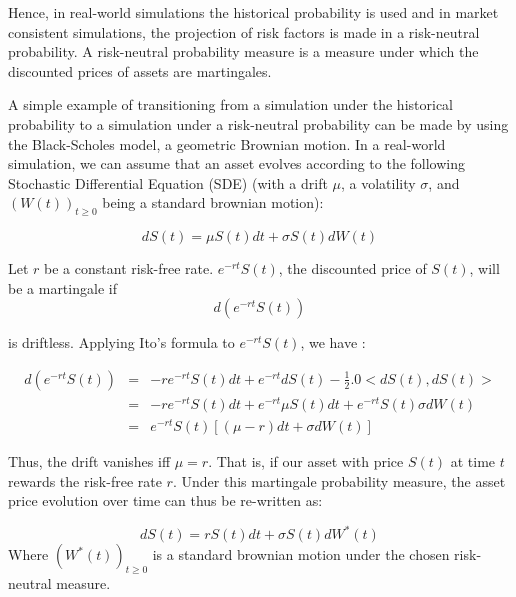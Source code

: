 \documentclass[a4paper]{article}\usepackage[]{graphicx}\usepackage[]{color}
\begin{document}
\medskip

Hence, in real-world simulations the historical probability is used and in market consistent simulations, the projection of risk factors is made in a risk-neutral probability. A risk-neutral probability measure is a measure under which the discounted prices of assets are martingales.  

\medskip

A simple example of transitioning from a simulation under the historical probability to a simulation under a risk-neutral probability can be made by using the Black-Scholes model, a geometric Brownian motion. In a real-world simulation, we can assume that an asset evolves according to the following Stochastic Differential Equation (SDE) (with a drift $\mu$, a volatility $\sigma$, and $\left( W(t) \right)_{t \geq 0}$ being a standard brownian motion): 

\begin{equation}
dS(t) = \mu S(t) dt + \sigma S(t) dW(t)
\end{equation}

\medskip

Let $r$ be a constant risk-free rate. $e^{-rt}S(t)$, the discounted price of $S(t)$, will be a martingale if 
\begin{equation}
d(e^{-rt}S(t))
\end{equation}

is driftless. Applying Ito's formula to $e^{-rt}S(t)$, we have : 

\begin{eqnarray}
d(e^{-rt}S(t)) &=& -r e^{-rt} S(t) dt + e^{-rt} dS(t) - \frac{1}{2}.0 <dS(t), dS(t)>\\
               &=& -r e^{-rt} S(t) dt + e^{-rt} \mu S(t) dt + e^{-rt} S(t) \sigma dW(t) \\
               &=&  e^{-rt} S(t) \left[  (\mu - r) dt + \sigma dW(t) \right]
\end{eqnarray}

Thus, the drift vanishes iff $\mu = r$. That is, if our asset with price $S(t)$ at time $t$ rewards the risk-free rate $r$. Under this martingale probability measure, the asset price evolution over time can thus be re-written as:

\begin{equation}
dS(t) = r S(t) dt + \sigma S(t) dW^*(t)
\end{equation}
Where $\left(W^*(t)\right)_{t \geq 0}$ is a standard brownian motion under the chosen risk-neutral measure. 
\end{document}
